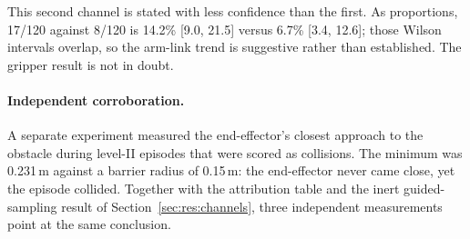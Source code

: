 This second channel is stated with less confidence than the first. As proportions, 17/120 against
8/120 is 14.2\% [9.0, 21.5] versus 6.7\% [3.4, 12.6]; those Wilson intervals overlap, so the
arm-link trend is suggestive rather than established. The gripper result is not in doubt.

\paragraph{Independent corroboration.}
A separate experiment measured the end-effector's closest approach to the obstacle during level-II
episodes that were scored as collisions. The minimum was 0.231\,m against a barrier radius of
0.15\,m: the end-effector never came close, yet the episode collided. Together with the attribution
table and the inert guided-sampling result of Section~\ref{sec:res:channels}, three independent
measurements point at the same conclusion.

